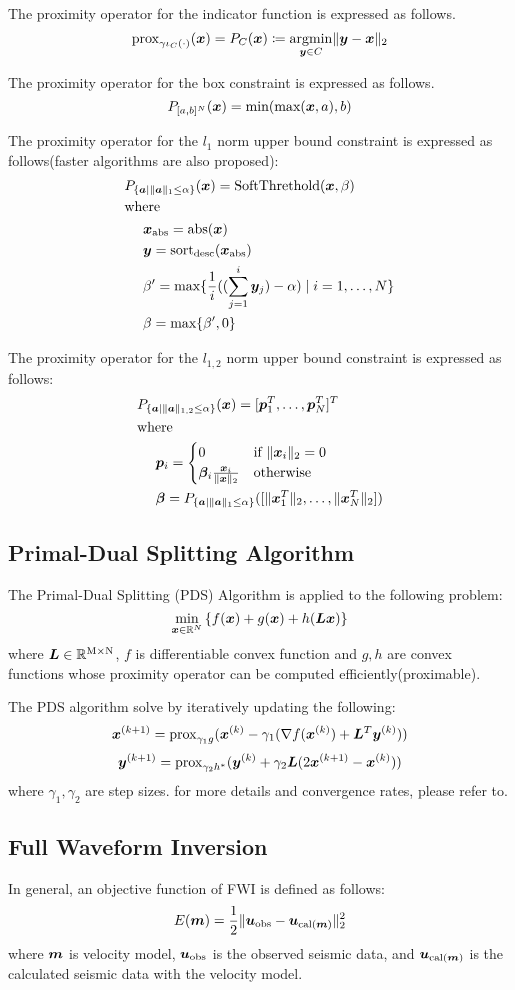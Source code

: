 The proximity operator for the indicator function is expressed as follows.
\begin{equation} \label{eq:ProximityOperatorDefinitionWithIndicatorFunctionEq}
\proximityOperator{ \gamma \indicatorFunction{C}{\cdot} }{\vecx} = P_C(\vecx) \coloneq \argmin{\vecy \in C} \LTwoNorm{\vecy - \vecx}
\end{equation}

The proximity operator for the box constraint is expressed as follows.
\begin{equation} \label{eq:ProximityOperatorForBoxConstraint} \projBoxSolution \end{equation}

The proximity operator for the $l_1$ norm upper bound constraint is expressed as follows\cite{L1-ball-projection}(faster algorithms are also proposed\cite{fast-L1-ball-projection}):
\begin{equation} \label{eq:ProximityOperatorForL1Ball}  \projLOneBallSolution \end{equation}

The proximity operator for the $l_{1,2}$ norm upper bound constraint is expressed as follows\cite{L12-ball-projection}:
\begin{equation} \label{eq:ProximityOperatorForL12Ball} \projLOneTwoBallSolution \end{equation}

\subsection{Primal-Dual Splitting Algorithm}\label{subsec:primal-dual-splitting-algorithm}
The Primal-Dual Splitting (PDS) Algorithm\cite{PDS0,PDS1,PDS2,PDS3} is applied to the following problem:
\begin{equation} \label{eq:PDSPrimalEq} \PDSPrimal \end{equation}
where $\bm{L} \in \realNumber^{\intM \times \intN}$, $f$ is differentiable convex function and $g,h$ are convex functions whose proximity operator can be computed efficiently(proximable).

The PDS algorithm solve by iteratively updating the following:
\begin{equation} \label{eq:PDSSubStepX} \PDSSubStepX \end{equation}
\begin{equation} \label{eq:PDSSubStepY} \PDSSubStepY \end{equation}
where $\gamma_1, \gamma_2$ are step sizes.
for more details and convergence rates, please refer to\cite{PDS2}.

\subsection{Full Waveform Inversion}\label{subsec:full-waveform-inversion}
In general, an objective function of FWI is defined as follows:
\begin{equation} \label{eq:FWIObjective} \FWIObjectiveDefinition \end{equation}
where $\velModel$ is velocity model, $\seismicData_{\mathrm{obs}}$ is the observed seismic data, and $\seismicData_{\mathrm{cal}(\velModel)}$ is the calculated seismic data with the velocity model.
